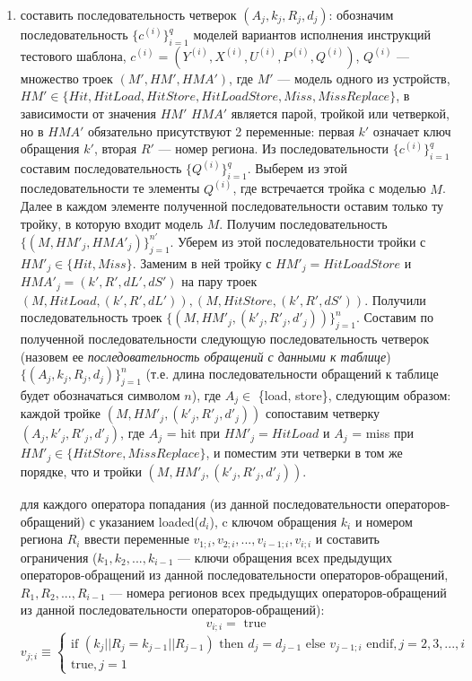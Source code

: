 \begin{enumerate}
  \item составить последовательность четверок $(A_j, k_j, R_j, d_j)$: обозначим  последовательность $\{c^{(i)}\}_{i=1}^q$ моделей вариантов исполнения инструкций тестового шаблона, $c^{(i)} = (Y^{(i)}, X^{(i)}, U^{(i)}, P^{(i)}, Q^{(i)})$, $Q^{(i)}$ --- множество троек $(M', HM', HMA')$, где $M'$ --- модель одного из устройств, $HM' \in \{Hit, HitLoad, HitStore, HitLoadStore, Miss, MissReplace\}$, в зависимости от значения $HM'$ $HMA'$ является парой, тройкой или четверкой, но в $HMA'$ обязательно присутствуют 2 переменные: первая $k'$ означает ключ обращения $k'$, вторая $R'$ --- номер региона. Из последовательности $\{c^{(i)}\}_{i=1}^q$ составим последовательность $\{Q^{(i)}\}_{i=1}^q$. Выберем из этой последовательности те элементы $Q^{(i)}$, где встречается тройка с моделью $M$. Далее в каждом элементе полученной последовательности оставим только ту тройку, в которую входит модель $M$. Получим последовательность $\{(M, HM'_j, HMA'_j)\}_{j=1}^{n'}$. Уберем из этой последовательности тройки с $HM'_j \in \{Hit, Miss\}$. Заменим в ней тройку с $HM'_j = HitLoadStore$ и $HMA'_j = (k', R', dL', dS')$ на пару троек $(M, HitLoad, (k', R', dL')), (M, HitStore, (k', R', dS'))$. Получили последовательность троек $\{(M, HM'_j, (k'_j, R'_j, d'_j))\}_{j=1}^n$. Составим по полученной последовательности следующую последовательность четверок (назовем ее \emph{последовательность обращений с данными к таблице}) $\{(A_j, k_j, R_j, d_j)\}_{j=1}^n$ (т.е. длина последовательности обращений к таблице будет обозначаться символом $n$), где $A_j \in$ \{load, store\}, следующим образом: каждой тройке $(M, HM'_j, (k'_j, R'_j, d'_j))$ сопоставим четверку $(A_j, k'_j, R'_j, d'_j)$, где $A_j$ = hit при $HM'_j = HitLoad$ и $A_j$ = miss при $HM'_j \in \{HitStore, MissReplace\}$, и поместим эти четверки в том же порядке, что и тройки $(M, HM'_j, (k'_j, R'_j, d'_j))$.


для каждого оператора попадания (из данной последовательности операторов-обращений) с указанием loaded($d_i$), c ключом обращения $k_i$ и номером региона $R_i$ ввести переменные $v_{1;i}, v_{2;i}, ..., v_{i-1;i}, v_{i;i}$ и составить ограничения ($k_1, k_2, ..., k_{i-1}$ --- ключи обращения всех предыдущих операторов-обращений из данной последовательности операторов-обращений, $R_1, R_2, ..., R_{i-1}$ --- номера регионов всех предыдущих операторов-обращений из данной последовательности операторов-обращений):
$$v_{i;i} = \mbox{~true}$$
$$v_{j;i} \equiv \begin{cases} \mbox{if~} (k_j||R_j = k_{j-1}||R_{j-1}) \mbox{~then~} d_j = d_{j-1} \mbox{~else~} v_{j-1;i} \mbox{~endif}, j{=}2,3,...,i\\
\mbox{true}, j{=}1\end{cases}$$


\end{enumerate}
